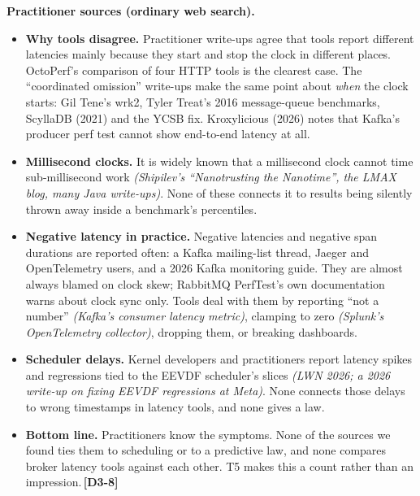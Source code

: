 \documentclass[11pt]{article}
\newcommand{\gl}[1]{{\color{soft}\itshape\small (#1)}}
\newcommand{\chgold}[1]{\,{\color{oldcol}\bfseries\footnotesize[#1]}}
\begin{document}
\textbf{Practitioner sources (ordinary web search).}
\begin{itemize}
  \item \textbf{Why tools disagree.} Practitioner write-ups agree that tools report different latencies mainly because they start and stop the clock in different places. OctoPerf's comparison of four HTTP tools is the clearest case. The ``coordinated omission'' write-ups make the same point about \emph{when} the clock starts: Gil Tene's wrk2, Tyler Treat's 2016 message-queue benchmarks, ScyllaDB (2021) and the YCSB fix. Kroxylicious (2026) notes that Kafka's producer perf test cannot show end-to-end latency at all.
  \item \textbf{Millisecond clocks.} It is widely known that a millisecond clock cannot time sub-millisecond work \gl{Shipilev's ``Nanotrusting the Nanotime'', the LMAX blog, many Java write-ups}. None of these connects it to results being silently thrown away inside a benchmark's percentiles.
  \item \textbf{Negative latency in practice.} Negative latencies and negative span durations are reported often: a Kafka mailing-list thread, Jaeger and OpenTelemetry users, and a 2026 Kafka monitoring guide. They are almost always blamed on clock skew; RabbitMQ PerfTest's own documentation warns about clock sync only. Tools deal with them by reporting ``not a number'' \gl{Kafka's consumer latency metric}, clamping to zero \gl{Splunk's OpenTelemetry collector}, dropping them, or breaking dashboards.
  \item \textbf{Scheduler delays.} Kernel developers and practitioners report latency spikes and regressions tied to the EEVDF scheduler's slices \gl{LWN 2026; a 2026 write-up on fixing EEVDF regressions at Meta}. None connects those delays to wrong timestamps in latency tools, and none gives a law.
  \item \textbf{Bottom line.} Practitioners know the symptoms. None of the sources we found ties them to scheduling or to a predictive law, and none compares broker latency tools against each other. T5 makes this a count rather than an impression.\chgold{D3-8}
\end{itemize}
\end{document}
